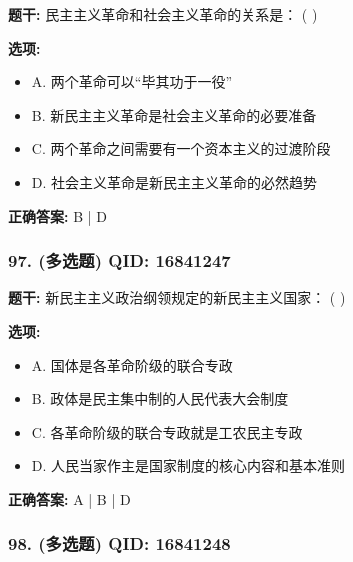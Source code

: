 \documentclass[12pt,UTF8]{ctexart}
\begin{document}
\textbf{题干:}
民主主义革命和社会主义革命的关系是： ( )

\textbf{选项:}
\begin{itemize}[leftmargin=*]

  \item A. 两个革命可以“毕其功于一役”

  \item B. 新民主主义革命是社会主义革命的必要准备

  \item C. 两个革命之间需要有一个资本主义的过渡阶段

  \item D. 社会主义革命是新民主主义革命的必然趋势

\end{itemize}

\textbf{正确答案:}
B | D

\vspace{0.3em}\hrulefill\vspace{0.7em}

\subsubsection*{97. (多选题) \small QID: 16841247}

\textbf{题干:}
新民主主义政治纲领规定的新民主主义国家： ( )

\textbf{选项:}
\begin{itemize}[leftmargin=*]

  \item A. 国体是各革命阶级的联合专政

  \item B. 政体是民主集中制的人民代表大会制度

  \item C. 各革命阶级的联合专政就是工农民主专政

  \item D. 人民当家作主是国家制度的核心内容和基本准则

\end{itemize}

\textbf{正确答案:}
A | B | D

\vspace{0.3em}\hrulefill\vspace{0.7em}

\subsubsection*{98. (多选题) \small QID: 16841248}
\end{document}
